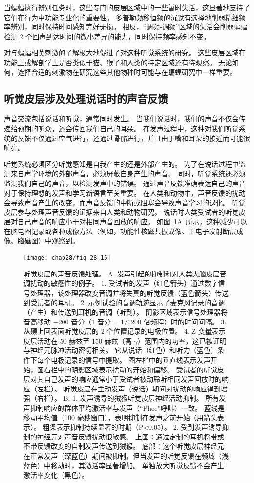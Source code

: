 当蝙蝠执行辨别任务时，这些专门的皮层区域中的一些暂时失活，这显著地支持了它们在行为中功能专业化的重要性。
多普勒频移恒频的沉默有选择地削弱精细频率辨别，同时保持时间感知完好无损。
相反，“调频-调频”区域的失活会削弱蝙蝠检测 2 个回声到达时间的微小差异的能力，同时保持频率感知不变。


对与蝙蝠相关刺激的了解极大地促进了对这种听觉系统的研究。
这些皮层区域在功能上或解剖学上是否类似于猫、猴子和人类的特定区域还有待观察。
无论如何，选择合适的刺激物在研究这些其他物种时可能与在蝙蝠研究中一样重要。



\subsection{听觉皮层涉及处理说话时的声音反馈}

声音交流包括说话和听觉，通常同时发生。
当我们说话时，我们的声音不仅会传递给预期的听众，还会传回我们自己的耳朵。
在发声过程中，这种对我们听觉系统的反馈不仅通过空气进行，还通过骨骼进行，并且由于嘴和耳朵的接近而可能很响亮。


听觉系统必须区分听觉感知是自我产生的还是外部产生的。
为了在说话过程中监测来自声学环境的外部声音，必须屏蔽自身产生的声音。
同时，听觉系统还必须监测我们自己的声音，以检测发声中的错误。
通过声音反馈准确表达自己的声音对于保持理想的发声和学习新语言至关重要。
在人类和动物中，声音反馈的扰动会导致声音产生的改变，而声音反馈的中断或阻塞会导致声音学习的退化。
听觉皮层参与处理声音反馈的证据来自人类和动物研究。
说话时人类受试者的听觉皮层对自己声音的响应小于对相同声音回放的响应。
如图~\ref{fig:28_15}A~所示，这种减少可以在脑电图记录或各种成像方法（例如，功能性核磁共振成像、正电子发射断层成像、脑磁图）中观察到。


\begin{figure}[htbp]
	\centering
	\texttt{[image: chap28/fig\_28\_15]}
	\caption{听觉皮层的声音反馈处理。
	A. 发声引起的抑制和对人类大脑皮层音调扰动的敏感性的例子。
	1. 受试者的发声（红色箭头）通过数字信号处理器，该处理器改变音调并将失真的听觉反馈（蓝色箭头）传送到受试者的耳机。 
	2. 示例试验的音调轨迹显示了麦克风记录的音调（产生）和传送到耳机的音调（听到）。
	阴影区域表示信号处理器将音高移动 −200 音分（1 音分 = 1/1200 倍频程）时的时间间隔。
	3. 从颞上回表面听觉皮层的 2 个位置记录的电极位置。
	4. Z 变量表示皮层活动在 50 赫兹至 150 赫兹（高 $\gamma$）范围内的功率，这已被证明与神经元脉冲活动密切相关。 
	它从说话（红色）和听力（蓝色）条件下每个电极记录的信号中提取。
	图左栏中的垂直线表示发声开始，图右栏中的阴影区域表示扰动的开始和偏移。
	受试者的听觉皮层对其自己发声的响应通常小于受试者被动聆听相同发声回放时的响应（左栏）。 
	听觉皮层在主动发声（说话）期间对扰动的响应得到增强（右栏）\cite{houde2015cortical}。
	B. 1. 发声诱导的狨猴听觉皮层神经活动抑制。 
	所有发声抑制响应的群体平均激活率与发声（“Phee”呼叫）一致。 
	蓝线是移动平均值（100 毫秒窗口），表明抑制在发声之前开始（用箭头表示）。 
	粗条表示抑制持续显著的时期（P<0.05）\cite{eliades2003sensory}。
	2. 受到发声诱导抑制的神经元对声音反馈扰动很敏感。
	上图：通过定制的耳机将带或不带反馈改变的自制发声传送到狨猴。
	底部：这个听觉皮层神经元在正常发声（深蓝色）期间被抑制，但当发声的听觉反馈在频域（浅蓝色）中移动时，其激活率显著增加。
	单独放大听觉反馈不会产生激活率变化（黑色）\cite{eliades2008neural}。}
	\label{fig:28_15}
\end{figure}


